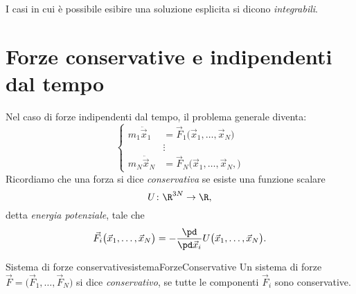 \begin{notz}
	I casi in cui è possibile esibire una soluzione esplicita si dicono \emph{integrabili}.
\end{notz}

\section{Forze conservative e indipendenti dal tempo}

Nel caso di forze indipendenti dal tempo, il problema generale diventa:
\[
	\left\{\begin{aligned}
		m_1 \ddot{\vec{x}}_1 & = \vec{F}_1\big(\vec{x}_1,\ldots,\vec{x}_N\big)  \\
		                     & \vdots                                           \\
		m_N \ddot{\vec{x}}_N & = \vec{F}_N\big(\vec{x}_1,\ldots,\vec{x}_N,\big)
	\end{aligned}\right.
\]
Ricordiamo che una forza si dice \emph{conservativa} se esiste una funzione scalare
\[
	U\colon \R^{3N} \to \R,
\]
detta \emph{energia potenziale}, tale che
\[
	\vec{F}_i \big(\vec{x}_1, \ldots, \vec{x}_N\big) = - \frac{\pd}{\pd\vec{x}_i} U\big(\vec{x}_1, \ldots, \vec{x}_N\big).
\]

\begin{defn}{Sistema di forze conservative}{sistemaForzeConservative}
	Un sistema di forze \(\vec{F}=\big(\vec{F}_1, \ldots, \vec{F}_N\big)\) si dice \emph{conservativo}, se tutte le componenti \(\vec{F}_i\) sono conservative.
\end{defn}

